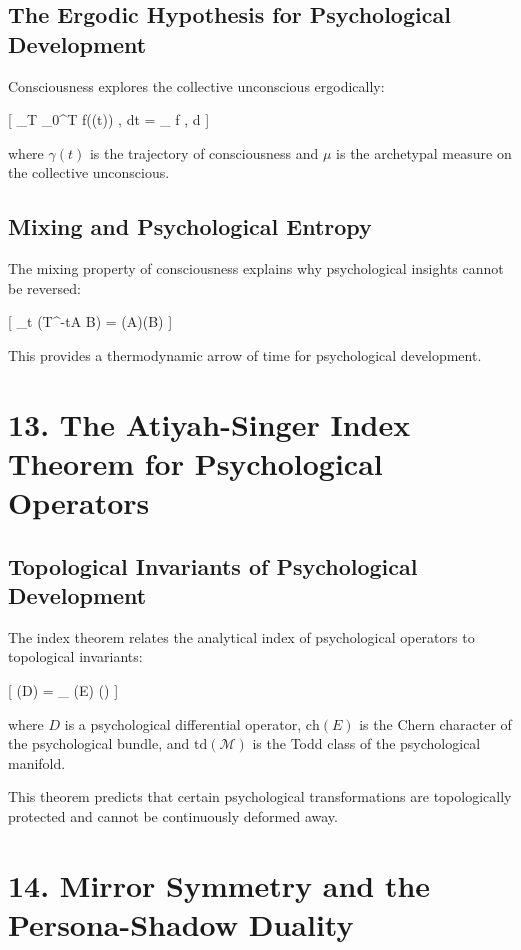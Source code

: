\documentclass[12pt]{article}
\begin{document}
\subsection*{The Ergodic Hypothesis for Psychological Development}

Consciousness explores the collective unconscious ergodically:

[
\lim_{T \rightarrow \infty}  \int_0^T f(\gamma(t)) , dt = \int_{} f , d\mu
]

where $\gamma(t)$ is the trajectory of consciousness and $\mu$ is the archetypal measure on the collective unconscious.

\subsection*{Mixing and Psychological Entropy}

The mixing property of consciousness explains why psychological insights cannot be reversed:

[
\lim_{t \rightarrow \infty} \mu(T^{-t}A \cap B) = \mu(A)\mu(B)
]

This provides a thermodynamic arrow of time for psychological development.

\section*{13. The Atiyah-Singer Index Theorem for Psychological Operators}

\subsection*{Topological Invariants of Psychological Development}

The index theorem relates the analytical index of psychological operators to topological invariants:

[
(D) = \int_{} (E) \cdot {}()
]

where $D$ is a psychological differential operator, $\text{ch}(E)$ is the Chern character of the psychological bundle, and $\text{td}(\mathcal{M})$ is the Todd class of the psychological manifold.

This theorem predicts that certain psychological transformations are topologically protected and cannot be continuously deformed away.

\section*{14. Mirror Symmetry and the Persona-Shadow Duality}
\end{document}

